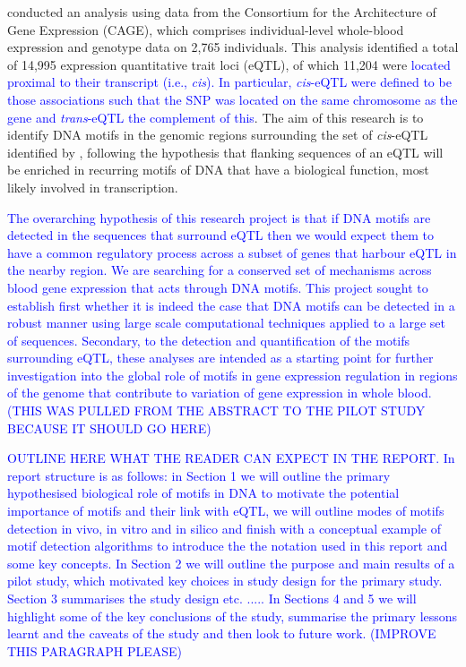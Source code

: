 \documentclass[12pt]{article}
\begin{document}
\citet{lloyd2017genetic} conducted an analysis using data from the Consortium for the Architecture of Gene Expression (CAGE), which comprises individual-level whole-blood expression and genotype data on 2,765 individuals. This analysis identified a total of 14,995 expression quantitative trait loci (eQTL), of which 11,204  were \textcolor{blue}{located proximal to their transcript (i.e., \emph{\emph{cis}}). In particular, \emph{cis}-eQTL were defined to be those associations such that the SNP was located on the same chromosome as the gene and \emph{trans}-eQTL the complement of this}. The aim of this research is to identify DNA motifs in the genomic regions surrounding the set of \emph{cis}-eQTL identified by \citet{lloyd2017genetic}, following the hypothesis that flanking sequences of an eQTL will be enriched in recurring motifs of DNA that have a biological function, most likely involved in transcription.

\textcolor{blue}{The overarching hypothesis of this research project is that if DNA motifs are detected in the sequences that surround eQTL then we would expect them to have a common regulatory process across a subset of genes that harbour eQTL in the nearby region. We are searching for a conserved set of mechanisms across blood gene expression that acts through DNA motifs. This project sought to establish first whether it is indeed the case that DNA motifs can be detected in a robust manner using large scale computational techniques applied to a large set of sequences. Secondary, to the detection and quantification of the motifs surrounding eQTL, these analyses are intended as a starting point for further investigation into the global role of motifs in  gene expression regulation in regions of the genome that contribute to variation of gene expression in whole blood. (THIS WAS PULLED FROM THE ABSTRACT TO THE PILOT STUDY BECAUSE IT SHOULD GO HERE)}

\textcolor{blue}{OUTLINE HERE WHAT THE READER CAN EXPECT IN THE REPORT. In report structure is as follows: in Section 1 we will outline the 
primary hypothesised biological role of motifs in DNA to motivate the potential importance of motifs and their link with eQTL, we will outline modes of motifs
detection in vivo, in vitro and in silico and finish with a conceptual example of motif detection algorithms to introduce the the notation used in this report and
some key concepts. In Section 2 we will outline the purpose and main results of a pilot study, which motivated key choices in study design for the primary
study.  Section 3 summarises the study design  etc. ..... In Sections 4 and 5 we will highlight some of the key conclusions of the study, summarise the
primary lessons learnt and the caveats of the study and then look to future work. (IMPROVE THIS PARAGRAPH PLEASE)}
 
\end{document}
